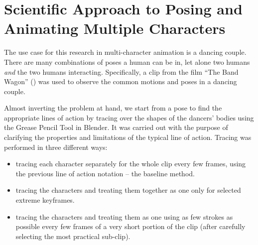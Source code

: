 \section{Scientific Approach to Posing and Animating Multiple Characters}

The use case for this research in multi-character animation is a dancing couple. There are many combinations of poses a human can be in, let alone two humans \textit{and} the two humans interacting. Specifically, a clip from the film ``The Band Wagon'' (\citep{thebandwagon1953}) was used to observe the common motions and poses in a dancing couple.

Almost inverting the problem at hand, we start from a pose to find the appropriate lines of action by tracing over the shapes of the dancers' bodies using the Grease Pencil Tool in Blender. It was carried out with the purpose of clarifying the properties and limitations of the typical line of action. Tracing was performed in three different ways:
\begin{itemize}
	\item tracing each character separately for the whole clip every few frames, using the previous line of action notation -- the baseline method.
	\item tracing the characters and treating them together as one only for selected extreme keyframes.
	\item tracing the characters and treating them as one using as few strokes as possible every few frames of a very short portion of the clip (after carefully selecting the most practical sub-clip).
\end{itemize}

